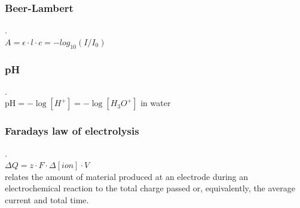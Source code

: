 \documentclass[9pt]{article}
\begin{document}
\begin{multicols}{2}
\subsubsection{Beer-Lambert}.\\
$A=\epsilon\cdot l\cdot c=-log_{10}(I/I_0)$
\subsubsection{pH}.\\
pH$= -\log [H^+] =-\log [H_3 O^+] $ in water
\subsubsection{Faradays law of electrolysis} \label{Faradays law of electrolysis}.\\
$\Delta Q= z\cdot F\cdot \Delta [ion]\cdot V$\\
relates the amount of material produced at an electrode during an electrochemical reaction to the total charge passed or, equivalently, the average current and total time.

\end{multicols}
\end{document}

